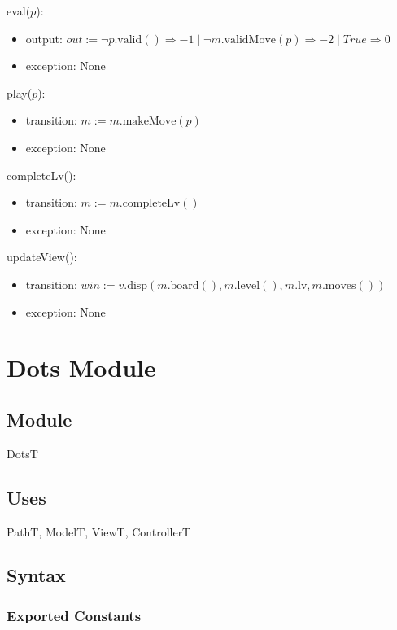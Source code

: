 \documentclass[12pt]{article}
\newcommand{\Implies}{\Rightarrow}
\begin{document}
\noindent eval($p$):
\begin{itemize}
	\item output: $out := \lnot p.\mbox{valid}() \Implies -1 \mid \lnot m.\mbox{validMove}(p) \Implies -2 \mid True \Implies 0$
	\item exception: None
\end{itemize}

\noindent play($p$):
\begin{itemize}
	\item transition: $m := m.\mbox{makeMove}(p)$
	\item exception: None
\end{itemize}

\noindent completeLv():
\begin{itemize}
	\item transition: $m := m.\mbox{completeLv}()$
	\item exception: None
\end{itemize}

\noindent updateView():
\begin{itemize}
	\item transition: $win := v.\mbox{disp}(m.\mbox{board}(), m.\mbox{level}(), m.\mbox{lv}, m.\mbox{moves}())$
	\item exception: None
\end{itemize}

\newpage

\section* {Dots Module}

\subsection*{Module}

DotsT

\subsection* {Uses}

PathT, ModelT, ViewT, ControllerT

\subsection* {Syntax}

\subsubsection* {Exported Constants}
\end{document}
